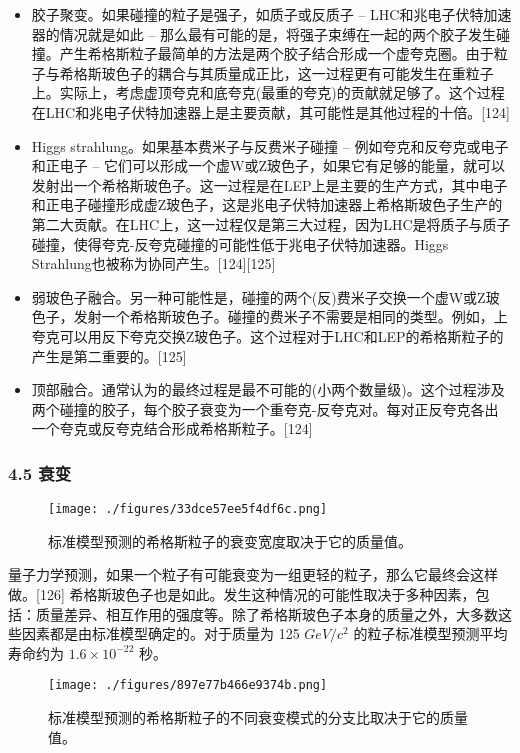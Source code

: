 \begin{itemize}
\item 胶子聚变。如果碰撞的粒子是强子，如质子或反质子 – LHC和兆电子伏特加速器的情况就是如此 – 那么最有可能的是，将强子束缚在一起的两个胶子发生碰撞。产生希格斯粒子最简单的方法是两个胶子结合形成一个虚夸克圈。由于粒子与希格斯玻色子的耦合与其质量成正比，这一过程更有可能发生在重粒子上。实际上，考虑虚顶夸克和底夸克(最重的夸克)的贡献就足够了。这个过程在LHC和兆电子伏特加速器上是主要贡献，其可能性是其他过程的十倍。[124]
\item Higgs strahlung。如果基本费米子与反费米子碰撞 – 例如夸克和反夸克或电子和正电子 – 它们可以形成一个虚W或Z玻色子，如果它有足够的能量，就可以发射出一个希格斯玻色子。这一过程是在LEP上是主要的生产方式，其中电子和正电子碰撞形成虚Z玻色子，这是兆电子伏特加速器上希格斯玻色子生产的第二大贡献。在LHC上，这一过程仅是第三大过程，因为LHC是将质子与质子碰撞，使得夸克-反夸克碰撞的可能性低于兆电子伏特加速器。Higgs Strahlung也被称为协同产生。[124][125]
\item 弱玻色子融合。另一种可能性是，碰撞的两个(反)费米子交换一个虚W或Z玻色子，发射一个希格斯玻色子。碰撞的费米子不需要是相同的类型。例如，上夸克可以用反下夸克交换Z玻色子。这个过程对于LHC和LEP的希格斯粒子的产生是第二重要的。[125]
\item 顶部融合。通常认为的最终过程是最不可能的(小两个数量级)。这个过程涉及两个碰撞的胶子，每个胶子衰变为一个重夸克-反夸克对。每对正反夸克各出一个夸克或反夸克结合形成希格斯粒子。[124]
\end{itemize}

\subsubsection{4.5 衰变}

\begin{figure}[ht]
\centering
\texttt{[image: ./figures/33dce57ee5f4df6c.png]}
\caption{标准模型预测的希格斯粒子的衰变宽度取决于它的质量值。} \label{fig_Higgs_12}
\end{figure}

量子力学预测，如果一个粒子有可能衰变为一组更轻的粒子，那么它最终会这样做。[126] 希格斯玻色子也是如此。发生这种情况的可能性取决于多种因素，包括：质量差异、相互作用的强度等。除了希格斯玻色子本身的质量之外，大多数这些因素都是由标准模型确定的。对于质量为 125 $GeV/c^2$ 的粒子标准模型预测平均寿命约为 $1.6\times10^{-22}$ 秒。

\begin{figure}[ht]
\centering
\texttt{[image: ./figures/897e77b466e9374b.png]}
\caption{标准模型预测的希格斯粒子的不同衰变模式的分支比取决于它的质量值。} \label{fig_Higgs_13}
\end{figure}

